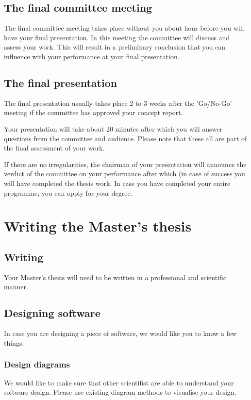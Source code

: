 \documentclass{latex-format/stylesheets/BEMNextstyle}
\begin{document}
\subsection*{The final committee meeting}
The final committee meeting takes place without you about hour before you will have your final presentation. In this meeting the committee will discuss and assess your work. This will result in a preliminary conclusion that you can influence with your performance at your final presentation. 

\subsection*{The final presentation}
The final presentation usually takes place 2 to 3 weeks after the 'Go/No-Go' meeting if the committee has approved your concept report.

Your presentation will take about 20 minutes after which you will answer questions from the committee and audience. Please note that these all are part of the final assessment of your work.

If there are no irregularities, the chairman of your presentation will announce the verdict of the committee on your performance after which (in case of success you will have completed the thesis work. In case you have completed your entire programme, you can apply for your degree.

\section*{Writing the Master's thesis}
\subsection*{Writing}
Your Master's thesis will need to be written in a professional and scientific manner.

\subsection*{Designing software}
In case you are designing a piece of software, we would like you to know a few things.

\subsubsection*{Design diagrams}
We would like to make sure that other scientifist are able to understand your software design. Please use existing diagram methods to visualise your design.
\end{document}
